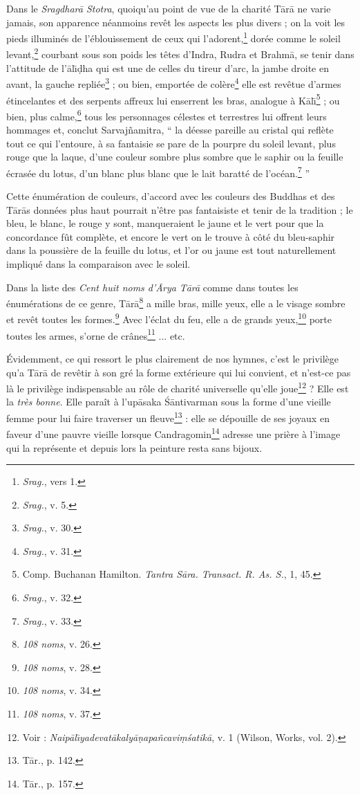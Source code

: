 \documentclass[a4paper, 11pt, oneside, french]{article}
\begin{document}
Dans le \emph{Sragdhar\={a} Stotra}, quoiqu'au point de vue de la charité T\={a}r\={a} ne varie jamais, son apparence néanmoins revêt les aspects les plus divers ; on la voit les pieds illuminés de l'éblouissement de ceux qui l'adorent,\footnote{\emph{Srag.}, vers 1.} dorée comme le soleil levant,\footnote{\emph{Srag.}, v. 5.} courbant sous son poids les têtes d'Indra, Rudra et Brahm\={a}, se tenir dans l'attitude de l'\={a}l\={\i}\d{d}ha qui est une de celles du tireur d'arc, la jambe droite en avant, la gauche repliée\footnote{\emph{Srag.}, v. 30.} ; ou bien, emportée de colère\footnote{\emph{Srag.}, v. 31.} elle est revêtue d'armes étincelantes et des serpents affreux lui enserrent les bras, analogue à K\={a}l\={\i}\footnote{Comp. Buchanan Hamilton. \emph{Tantra S\={a}ra. Transact. R. As. S.}, 1, 45.} ; ou bien, plus calme,\footnote{\emph{Srag.}, v. 32.} tous les personnages célestes et terrestres lui offrent leurs hommages et, conclut Sarvaj\~{n}amitra, `` la déesse pareille au cristal qui reflète tout ce qui l'entoure, à sa fantaisie se pare de la pourpre du soleil levant, plus rouge que la laque, d'une couleur sombre plus sombre que le saphir ou la feuille écrasée du lotus, d'un blanc plus blanc que le lait baratté de l'océan.\footnote{\emph{Srag.}, v. 33.} ''

Cette énumération de couleurs, d'accord avec les couleurs des Buddhas et des T\={a}r\={a}s données plus haut pourrait n'être pas fantaisiste et tenir de la tradition ; le bleu, le blanc, le rouge y sont, manqueraient le jaune et le vert pour que la concordance fût complète, et encore le vert on le trouve à côté du bleu-saphir dans la poussière de la feuille du lotus, et l'or ou jaune est tout naturellement impliqué dans la comparaison avec le soleil.

Dans la liste des \emph{Cent huit noms d'\={A}rya T\={a}r\={a}} comme dans toutes les énumérations de ce genre, T\={a}r\={a}\footnote{\emph{108 noms}, v. 26.} a mille bras, mille yeux, elle a le visage sombre et revêt toutes les formes.\footnote{\emph{108 noms}, v. 28.} Avec l'éclat du feu, elle a de grands yeux,\footnote{\emph{108 noms}, v. 34.} porte toutes les armes, s'orne de crânes\footnote{\emph{108 noms}, v. 37.} ... etc.

Évidemment, ce qui ressort le plus clairement de nos hymnes, c'est le privilège qu'a T\={a}r\={a} de revêtir à son gré la forme extérieure qui lui convient, et n'est-ce pas là le privilège indispensable au rôle de charité universelle qu'elle joue\footnote{Voir : \emph{Naip\={a}l\={\i}yadevat\={a}kaly\={a}\d{n}apa\~{n}cavi\d{m}\'{s}atik\={a}}, v. 1 (Wilson, Works, vol. 2).} ? Elle est la \emph{très bonne}. Elle paraît à l'up\={a}saka \'{S}\={a}ntivarman sous la forme d'une vieille femme pour lui faire traverser un fleuve\footnote{T\={a}r., p. 142.} : elle se dépouille de ses joyaux en faveur d'une pauvre vieille lorsque Candragomin\footnote{T\={a}r., p. 157.} adresse une prière à l'image qui la représente et depuis lors la peinture resta sans bijoux.
\clearpage
\end{document}
